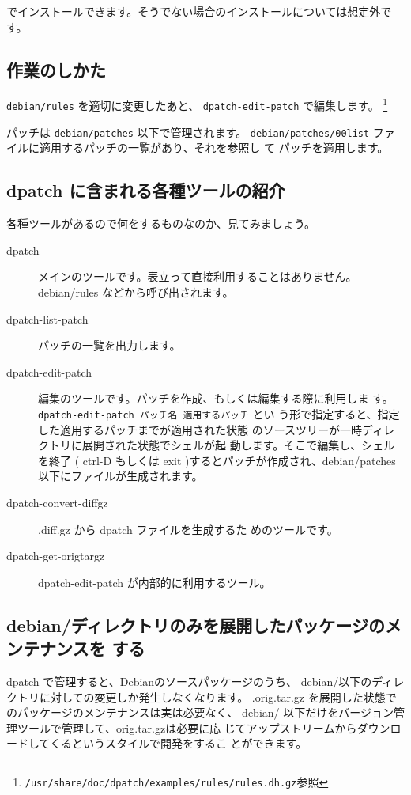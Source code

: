 \documentclass[mingoth,a4paper]{jsarticle}
\begin{document}
でインストールできます。そうでない場合のインストールについては想定外です。

\subsection{作業のしかた}

\texttt{debian/rules} を適切に変更したあと、
\texttt{dpatch-edit-patch} で編集します。
\footnote{\texttt{/usr/share/doc/dpatch/examples/rules/rules.dh.gz}参照}

パッチは \texttt{debian/patches} 以下で管理されます。
\texttt{debian/patches/00list} ファイルに適用するパッチの一覧があり、それを参照し
て パッチを適用します。

\subsection{dpatch に含まれる各種ツールの紹介}

各種ツールがあるので何をするものなのか、見てみましょう。

\begin{description}
 \item[dpatch] メインのツールです。表立って直接利用することはありません。
	    debian/rules などから呼び出されます。
 \item[dpatch-list-patch] パッチの一覧を出力します。
 \item[dpatch-edit-patch] 編集のツールです。パッチを作成、もしくは編集する際に利用しま
	    す。\texttt{dpatch-edit-patch パッチ名 適用するパッチ} とい
	    う形で指定すると、指定した適用するパッチまでが適用された状態
	    のソースツリーが一時ディレクトリに展開された状態でシェルが起
	    動します。そこで編集し、シェルを終了 ( ctrl-D もしくは exit
	    )するとパッチが作成され、debian/patches 以下にファイルが生成されます。
 \item[dpatch-convert-diffgz] .diff.gz から dpatch ファイルを生成するた
	    めのツールです。
 \item[dpatch-get-origtargz] dpatch-edit-patch が内部的に利用するツール。
\end{description}

\subsection{debian/ディレクトリのみを展開したパッケージのメンテナンスを
  する}

dpatch で管理すると、Debianのソースパッケージのうち、
debian/以下のディレクトリに対しての変更しか発生しなくなります。
.orig.tar.gz を展開した状態でのパッケージのメンテナンスは実は必要なく、
debian/ 以下だけをバージョン管理ツールで管理して、orig.tar.gzは必要に応
じてアップストリームからダウンロードしてくるというスタイルで開発をするこ
とができます。
\end{document}
